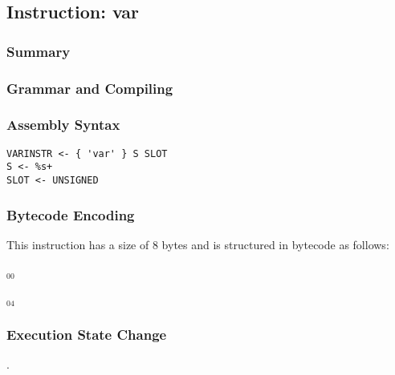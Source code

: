 \subsection{Instruction: var}

\subsubsection{Summary}


\subsubsection{Grammar and Compiling}


\subsubsection{Assembly Syntax}

\begin{myquote}
\begin{verbatim}
VARINSTR <- { 'var' } S SLOT
S <- %s+
SLOT <- UNSIGNED
\end{verbatim}
\end{myquote}

\subsubsection{Bytecode Encoding}

This instruction has a size of 8 bytes and is structured in bytecode as follows:

$_{00}$\ 



$_{04}$\ 


\subsubsection{Execution State Change}

.


